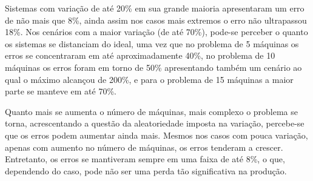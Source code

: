     Sistemas com variação de até 20\% em sua grande maioria apresentaram um erro de não mais que 8\%, ainda assim nos casos mais extremos o erro não ultrapassou 18\%. Nos cenários com a maior variação (de até 70\%), pode-se perceber o quanto os sistemas se distanciam do ideal, uma vez que no problema de 5 máquinas os erros se concentraram em até aproximadamente 40\%, no problema de 10 máquinas os erros foram em torno de 50\% apresentando também um cenário ao qual o máximo alcançou de 200\%, e para o problema de 15 máquinas a maior parte se manteve em até 70\%.
    
    Quanto mais se aumenta o número de máquinas, mais complexo o problema se torna, acrescentando a questão da aleatoriedade imposta na variação, percebe-se que os erros podem aumentar ainda mais. Mesmos nos casos com pouca variação, apenas com aumento no número de máquinas, os erros tenderam a crescer. Entretanto, os erros se mantiveram sempre em uma faixa de até 8\%, o que, dependendo do caso, pode não ser uma perda tão significativa na produção. 
    
    






